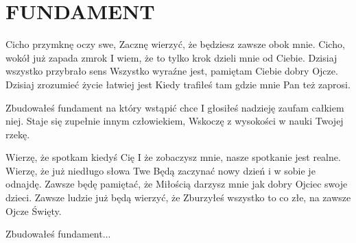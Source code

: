 \documentclass[../../../songbook.tex]{subfiles}
\begin{document}
\TabPositions{8cm} %
\section*{FUNDAMENT}
{}
\vspace{0.5cm}
Cicho przymknę oczy swe,							 \newline
Zacznę wierzyć, że będziesz zawsze obok mnie.		 \newline
Cicho, wokół już zapada zmrok 						\newline
I wiem, że to tylko krok dzieli mnie od Ciebie.						\newline
Dzisiaj wszystko przybrało sens						\newline
Wszystko wyraźne jest, pamiętam Ciebie dobry Ojcze.						\newline
Dzisiaj zrozumieć życie łatwiej jest 						\newline
Kiedy trafiłeś tam gdzie mnie Pan też zaprosi.						\newline

\-\hspace{0.5cm}Zbudowałeś fundament na który wstąpić chce	 \newline
\-\hspace{0.5cm}I głosiłeś nadzieję zaufam całkiem niej.		 \newline
\-\hspace{0.5cm}Staje się zupełnie innym człowiekiem,			 \newline
\-\hspace{0.5cm}Wskoczę z wysokości w nauki Twojej rzekę.		 \newline

Wierzę, że spotkam kiedyś Cię 						\newline
I że zobaczysz mnie, nasze spotkanie jest realne.						\newline
Wierzę, że już niedługo słowa Twe						\newline
Będą zaczynać nowy dzień i w sobie je odnajdę.						\newline
Zawsze będę pamiętać, że 						\newline
Miłością darzysz mnie jak dobry Ojciec swoje dzieci.						\newline
Zawsze ludzie już będą wierzyć, że 						\newline
Zburzyłeś wszystko to co złe, na zawsze Ojcze Święty.						\newline

\-\hspace{1cm}Zbudowałeś fundament...						\newline
\end{document}
